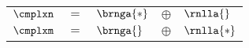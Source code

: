 \begin{table}[htdp]
\begin{center}
\begin{tabular}{lclcl}
%
$\cmplxn$ & $=$ & $\brnga{*}$ & $\oplus$ & $\rnlla{}$ \\
$\cmplxm$ & $=$ & $\brnga{}$  & $\oplus$ & $\rnlla{*}$
%
\end{tabular}
\end{center}
\label{tab:ftola:statement}
\end{table}%


\endinput
